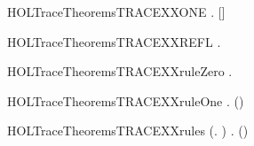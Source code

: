\begin{SaveVerbatim}{HOLTraceTheoremsTRACEXXONE}
\HOLTokenTurnstile{} \HOLSymConst{\HOLTokenForall{}}  .   []  \HOLSymConst{\HOLTokenEquiv{}}  \HOLTokenTransBegin{}\HOLTokenTransEnd {}
\end{SaveVerbatim}
\newcommand{\HOLTraceTheoremsTRACEXXONE}{\UseVerbatim{HOLTraceTheoremsTRACEXXONE}}
\begin{SaveVerbatim}{HOLTraceTheoremsTRACEXXREFL}
\HOLTokenTurnstile{} \HOLSymConst{\HOLTokenForall{}}.   \HOLConst{\ensuremath{\epsilon}} 
\end{SaveVerbatim}
\newcommand{\HOLTraceTheoremsTRACEXXREFL}{\UseVerbatim{HOLTraceTheoremsTRACEXXREFL}}
\begin{SaveVerbatim}{HOLTraceTheoremsTRACEXXruleZero}
\HOLTokenTurnstile{} \HOLSymConst{\HOLTokenForall{}}.   \HOLConst{\ensuremath{\epsilon}} 
\end{SaveVerbatim}
\newcommand{\HOLTraceTheoremsTRACEXXruleZero}{\UseVerbatim{HOLTraceTheoremsTRACEXXruleZero}}
\begin{SaveVerbatim}{HOLTraceTheoremsTRACEXXruleOne}
\HOLTokenTurnstile{} \HOLSymConst{\HOLTokenForall{}}    .  \HOLTokenTransBegin{}\HOLTokenTransEnd {} \HOLSymConst{\HOLTokenConj{}}     \HOLSymConst{\HOLTokenImp{}}   (\HOLSymConst{::}) 
\end{SaveVerbatim}
\newcommand{\HOLTraceTheoremsTRACEXXruleOne}{\UseVerbatim{HOLTraceTheoremsTRACEXXruleOne}}
\begin{SaveVerbatim}{HOLTraceTheoremsTRACEXXrules}
\HOLTokenTurnstile{} (\HOLSymConst{\HOLTokenForall{}}.   \HOLConst{\ensuremath{\epsilon}} ) \HOLSymConst{\HOLTokenConj{}}
   \HOLSymConst{\HOLTokenForall{}}    .  \HOLTokenTransBegin{}\HOLTokenTransEnd {} \HOLSymConst{\HOLTokenConj{}}     \HOLSymConst{\HOLTokenImp{}}   (\HOLSymConst{::}) 
\end{SaveVerbatim}
